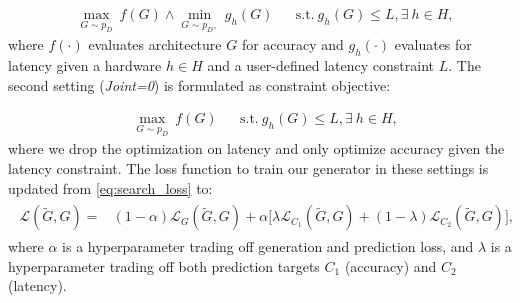 \documentclass[runningheads]{llncs}
\begin{document}
\begin{align}\label{eq:joint=1_optimization}
     & \underset{G \sim p_D}{\max}~ f(G) \wedge \underset{G \sim p_D,  }{\min} ~ g_h(G) 
     &
     & \textrm{s.t.}~  g_h(G) \leq L,\exists~ h \in H, 
\end{align}
where $f(\cdot)$ evaluates architecture $G$ for accuracy and $g_h(\cdot)$ evaluates for latency given a hardware $h \in H$ and a user-defined latency constraint $L$.
The second setting (\emph{Joint=0}) is formulated as constraint objective:

\begin{align}\label{eq:joint=0_optimization}
    & \underset{G \sim p_D}{\max} ~ f(G)  &
    & \textrm{s.t.}~  g_h(G) \leq L,\exists~ h \in H, 
\end{align}
where we drop the optimization on latency and only optimize accuracy given the latency constraint.
The loss function to train our generator in these settings is updated from \autoref{eq:search_loss} to:
\begin{align}\label{eq:hw_cond_loss}
\begin{split}
\mathcal{L}(\tilde{G},G) = & (1-\alpha) \mathcal{L}_G(\tilde{G},G) + \alpha \big[\lambda \mathcal{L}_{C_1}(\tilde{G},G)+ (1- \lambda)\mathcal{L}_{C_2}(\tilde{G},G)\big], 
        \end{split}
\end{align}
where $\alpha$ is a hyperparameter trading off generation and prediction loss, and $\lambda$ is a hyperparameter trading off both prediction targets $C_1$ (accuracy) and $C_2$ (latency).
\end{document}

